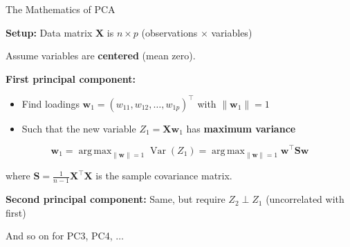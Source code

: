\documentclass[10pt]{beamer}
\newcommand{\highlight}[1]{\textcolor{AccentOrange}{\textbf{#1}}}
\DeclareMathOperator*{\argmax}{arg\,max}
\DeclareMathOperator{\Var}{Var}
\begin{document}
\begin{frame}{The Mathematics of PCA}

  \textbf{Setup:} Data matrix $\mathbf{X}$ is $n \times p$ (observations $\times$ variables)

  \vspace{0.5em}
  Assume variables are \highlight{centered} (mean zero).

  \vspace{1em}
  \textbf{First principal component:}
  \begin{itemize}
    \item Find loadings $\mathbf{w}_1 = (w_{11}, w_{12}, \ldots, w_{1p})^\top$ with $\|\mathbf{w}_1\| = 1$
    \item Such that the new variable $Z_1 = \mathbf{X}\mathbf{w}_1$ has \highlight{maximum variance}
  \end{itemize}

  \[
  \mathbf{w}_1 = \argmax_{\|\mathbf{w}\|=1} \Var(Z_1) = \argmax_{\|\mathbf{w}\|=1} \mathbf{w}^\top \mathbf{S} \mathbf{w}
  \]

  where $\mathbf{S} = \frac{1}{n-1}\mathbf{X}^\top\mathbf{X}$ is the sample covariance matrix.

  \vspace{1em}
  \textbf{Second principal component:} Same, but require $Z_2 \perp Z_1$ (uncorrelated with first)

  \vspace{0.5em}
  And so on for PC3, PC4, $\ldots$
\end{frame}

\end{document}
